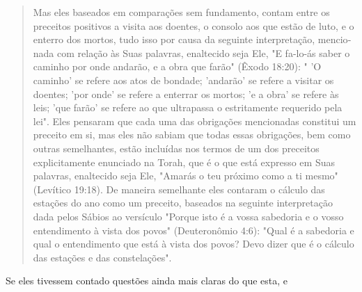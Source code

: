 \begin{quote}
Mas eles baseados em comparações sem fundamento, contam entre os
preceitos positivos a visita aos doentes, o consolo aos que estão de
luto, e o enterro dos mortos, tudo isso por causa da seguinte
interpretação, mencio­nada com relação às Suas palavras, enaltecido seja
Ele, "E fa-lo-ás saber o cami­nho por onde andarão, e a obra que farão"
(Êxodo 18:20): " 'O caminho' se refere aos atos de bondade; 'andarão' se
refere a visitar os doentes; 'por onde' se refere a enterrar os mortos;
'e a obra' se refere às leis; 'que farão' se refere ao que ultrapassa o
estritamente requerido pela lei". Eles pensaram que cada uma das
obrigações mencionadas constitui um preceito em si, mas eles não sa­biam
que todas essas obrigações, bem como outras semelhantes, estão
incluí­das nos termos de um dos preceitos explicitamente enunciado na
Torah, que é o que está expresso em Suas palavras, enaltecido seja Ele,
"Amarás o teu pró­ximo como a ti mesmo" (Levítico 19:18). De maneira
semelhante eles conta­ram o cálculo das estações do ano como um
preceito, baseados na seguinte in­terpretação dada pelos Sábios ao
versículo "Porque isto é a vossa sabedoria e o vosso entendimento à
vista dos povos" (Deuteronômio 4:6): "Qual é a sabe­doria e qual o
entendimento que está à vista dos povos? Devo dizer que é o cálculo das
estações e das constelações".
\end{quote}

Se eles tivessem contado questões ainda mais claras do que esta, e

